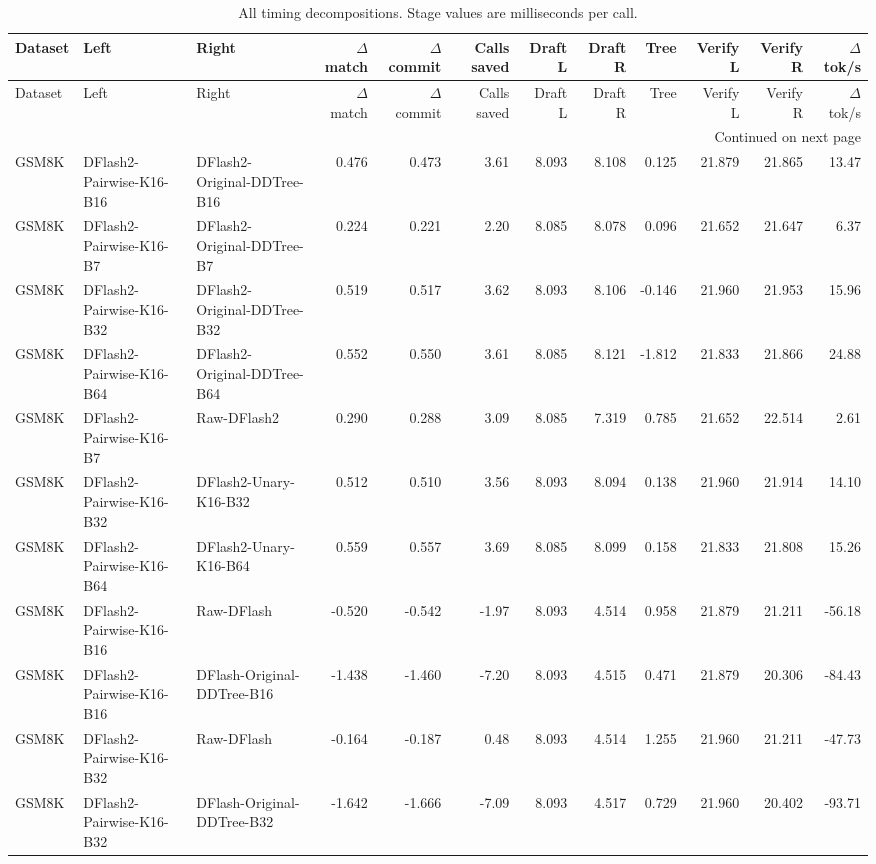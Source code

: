 \begin{longtable}{lllrrrrrrrrr}
\caption{All timing decompositions. Stage values are milliseconds per call.}\label{tab:all-timing}\\
\toprule
Dataset & Left & Right & $\Delta$ match & $\Delta$ commit & Calls saved & Draft L & Draft R & Tree & Verify L & Verify R & $\Delta$ tok/s \\
\midrule
\endfirsthead
\toprule
Dataset & Left & Right & $\Delta$ match & $\Delta$ commit & Calls saved & Draft L & Draft R & Tree & Verify L & Verify R & $\Delta$ tok/s \\
\midrule
\endhead
\midrule
\multicolumn{12}{r}{Continued on next page}\\
\endfoot
\bottomrule
\endlastfoot
GSM8K & DFlash2-Pairwise-K16-B16 & DFlash2-Original-DDTree-B16 & 0.476 & 0.473 & 3.61 & 8.093 & 8.108 & 0.125 & 21.879 & 21.865 & 13.47 \\
GSM8K & DFlash2-Pairwise-K16-B7 & DFlash2-Original-DDTree-B7 & 0.224 & 0.221 & 2.20 & 8.085 & 8.078 & 0.096 & 21.652 & 21.647 & 6.37 \\
GSM8K & DFlash2-Pairwise-K16-B32 & DFlash2-Original-DDTree-B32 & 0.519 & 0.517 & 3.62 & 8.093 & 8.106 & -0.146 & 21.960 & 21.953 & 15.96 \\
GSM8K & DFlash2-Pairwise-K16-B64 & DFlash2-Original-DDTree-B64 & 0.552 & 0.550 & 3.61 & 8.085 & 8.121 & -1.812 & 21.833 & 21.866 & 24.88 \\
GSM8K & DFlash2-Pairwise-K16-B7 & Raw-DFlash2 & 0.290 & 0.288 & 3.09 & 8.085 & 7.319 & 0.785 & 21.652 & 22.514 & 2.61 \\
GSM8K & DFlash2-Pairwise-K16-B32 & DFlash2-Unary-K16-B32 & 0.512 & 0.510 & 3.56 & 8.093 & 8.094 & 0.138 & 21.960 & 21.914 & 14.10 \\
GSM8K & DFlash2-Pairwise-K16-B64 & DFlash2-Unary-K16-B64 & 0.559 & 0.557 & 3.69 & 8.085 & 8.099 & 0.158 & 21.833 & 21.808 & 15.26 \\
GSM8K & DFlash2-Pairwise-K16-B16 & Raw-DFlash & -0.520 & -0.542 & -1.97 & 8.093 & 4.514 & 0.958 & 21.879 & 21.211 & -56.18 \\
GSM8K & DFlash2-Pairwise-K16-B16 & DFlash-Original-DDTree-B16 & -1.438 & -1.460 & -7.20 & 8.093 & 4.515 & 0.471 & 21.879 & 20.306 & -84.43 \\
GSM8K & DFlash2-Pairwise-K16-B32 & Raw-DFlash & -0.164 & -0.187 & 0.48 & 8.093 & 4.514 & 1.255 & 21.960 & 21.211 & -47.73 \\
GSM8K & DFlash2-Pairwise-K16-B32 & DFlash-Original-DDTree-B32 & -1.642 & -1.666 & -7.09 & 8.093 & 4.517 & 0.729 & 21.960 & 20.402 & -93.71 \\

\end{longtable}

